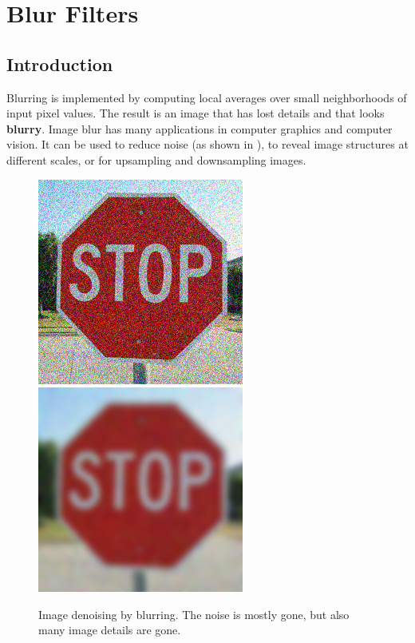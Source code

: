 
\chapter{Blur Filters}
\label{chap:blur_filters}




\section{Introduction}

Blurring is implemented by computing local averages over small neighborhoods of input pixel values. The result is an image that has lost details and that looks {\bf blurry}. Image blur has many applications in computer graphics and computer vision. It can be used to reduce noise (as shown in \fig{\ref{fig:stop_256_noise_3}}), to reveal image structures at different scales, or for upsampling and downsampling images.


\begin{figure}[h]
	\centerline{
		\includegraphics[width=.45\linewidth]{figures/blur_filters/stop_256_noise_3.jpg}~
		\includegraphics[width=.45\linewidth]{figures/blur_filters/stop_256_blur_3.jpg}
	}
	\caption{Image denoising by blurring. The noise is mostly gone, but also many image details are gone.}
	\label{fig:stop_256_noise_3}
\end{figure}


